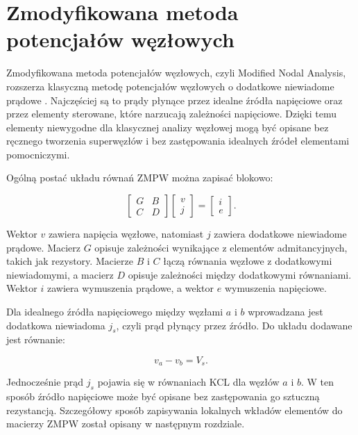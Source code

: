 \section{Zmodyfikowana metoda potencjałów węzłowych}
\label{sec:zmodyfikowana-mpw}

Zmodyfikowana metoda potencjałów węzłowych, czyli Modified Nodal Analysis, rozszerza klasyczną metodę potencjałów węzłowych o dodatkowe niewiadome prądowe \cite{ho1975mna,vlach1994computer}. Najczęściej są to prądy płynące przez idealne źródła napięciowe oraz przez elementy sterowane, które narzucają zależności napięciowe. Dzięki temu elementy niewygodne dla klasycznej analizy węzłowej mogą być opisane bez ręcznego tworzenia superwęzłów i bez zastępowania idealnych źródeł elementami pomocniczymi.

Ogólną postać układu równań ZMPW można zapisać blokowo:

\begin{equation}
\label{eq:mna-system}
\begin{bmatrix}
G & B \\
C & D
\end{bmatrix}
\begin{bmatrix}
v \\
j
\end{bmatrix}
=
\begin{bmatrix}
i \\
e
\end{bmatrix}.
\end{equation}

Wektor \(v\) zawiera napięcia węzłowe, natomiast \(j\) zawiera dodatkowe niewiadome prądowe. Macierz \(G\) opisuje zależności wynikające z elementów admitancyjnych, takich jak rezystory. Macierze \(B\) i \(C\) łączą równania węzłowe z dodatkowymi niewiadomymi, a macierz \(D\) opisuje zależności między dodatkowymi równaniami. Wektor \(i\) zawiera wymuszenia prądowe, a wektor \(e\) wymuszenia napięciowe.

Dla idealnego źródła napięciowego między węzłami \(a\) i \(b\) wprowadzana jest dodatkowa niewiadoma \(j_s\), czyli prąd płynący przez źródło. Do układu dodawane jest równanie:

\begin{equation}
\label{eq:mna-voltage-source}
v_a - v_b = V_s.
\end{equation}

Jednocześnie prąd \(j_s\) pojawia się w równaniach KCL dla węzłów \(a\) i \(b\). W ten sposób źródło napięciowe może być opisane bez zastępowania go sztuczną rezystancją. Szczegółowy sposób zapisywania lokalnych wkładów elementów do macierzy ZMPW został opisany w następnym rozdziale.

